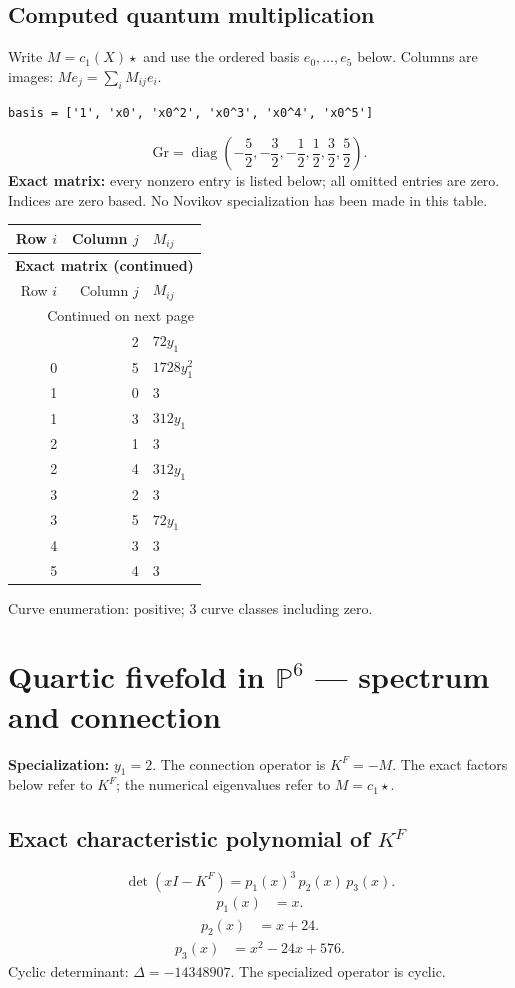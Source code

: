 \documentclass[10pt,a4paper]{article}
\begin{document}
\subsection*{Computed quantum multiplication}
Write $M=c_1(X)\star$ and use the ordered basis $e_0,\ldots,e_{5}$ below. Columns are images: $M e_j=\sum_i M_{ij}e_i$.
\begin{lstlisting}
basis = ['1', 'x0', 'x0^2', 'x0^3', 'x0^4', 'x0^5']
\end{lstlisting}
\[\mathrm{Gr}=\operatorname{diag}\!\left(- \frac{5}{2},- \frac{3}{2},- \frac{1}{2},\frac{1}{2},\frac{3}{2},\frac{5}{2}\right).\]
\textbf{Exact matrix:} every nonzero entry is listed below; all omitted entries are zero. Indices are zero based. No Novikov specialization has been made in this table.
{\small\setlength{\tabcolsep}{7pt}\begin{longtable}{rrp{125mm}}
\toprule Row $i$ & Column $j$ & $M_{ij}$\\\midrule\endfirsthead
\multicolumn{3}{l}{\textbf{Exact matrix (continued)}}\\
\toprule Row $i$ & Column $j$ & $M_{ij}$\\\midrule\endhead
\midrule\multicolumn{3}{r}{Continued on next page}\\\endfoot\bottomrule\endlastfoot
0 & 2 & $72 y_{1}$\\
0 & 5 & $1728 y_{1}^{2}$\\
1 & 0 & $3$\\
1 & 3 & $312 y_{1}$\\
2 & 1 & $3$\\
2 & 4 & $312 y_{1}$\\
3 & 2 & $3$\\
3 & 5 & $72 y_{1}$\\
4 & 3 & $3$\\
5 & 4 & $3$\\
\end{longtable}}
Curve enumeration: positive; 3 curve classes including zero.
\clearpage\section*{Quartic fivefold in $\mathbb P^{6}$ --- spectrum and connection}
\textbf{Specialization:} $y_1=2$. The connection operator is $K^F=-M$. The exact factors below refer to $K^F$; the numerical eigenvalues refer to $M=c_1\star$.
\subsection*{Exact characteristic polynomial of $K^F$}
\[\det(xI-K^F)=p_{1}(x)^{3}\,p_{2}(x)\,p_{3}(x).\]
\[\begin{aligned}p_{1}(x)&=x.\end{aligned}\]
\[\begin{aligned}p_{2}(x)&=x + 24.\end{aligned}\]
\[\begin{aligned}p_{3}(x)&=x^{2} - 24 x + 576.\end{aligned}\]
Cyclic determinant: $\Delta=-14348907$. The specialized operator is cyclic.
\end{document}
